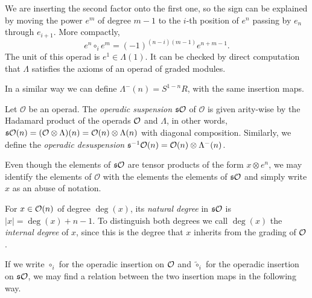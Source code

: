 \documentclass[join.tex]{subfiles}
\begin{document}
We are inserting the second factor onto the first one, so the sign can be explained  by moving the power $e^m$ of degree $m-1$ to the $i$-th position of $e^n$ passing by $e_{n}$ through $e_{i+1}$. More compactly, \[e^n\circ_i e^m=(-1)^{(n-i)(m-1)}e^{n+m-1}.\] The unit of this operad is $e^1\in\Lambda(1)$. It can be checked by direct computation that $\Lambda$ satisfies the axioms of an operad of graded modules.

In a similar way we can define $\Lambda^-(n)=S^{1-n}R$, with the same insertion maps.
\begin{defin}
Let $\mathcal{O}$ be an operad. The \emph{operadic suspension} $\mathfrak{s}{\mathcal O}$ of $\mathcal{O}$ is given arity-wise by the Hadamard product of the operads ${\mathcal O}$ and $\Lambda$, in other words, $\mathfrak{s}{\mathcal O}(n)=(\mathcal{O}\otimes\Lambda)(n)=\mathcal{O}(n)\otimes\Lambda(n)$ with diagonal composition. Similarly, we define the \emph{operadic desuspension} $\mathfrak{s}^{-1}{\mathcal O}(n)=\mathcal{O}(n)\otimes\Lambda^-(n)$.
\end{defin}

Even though the elements of $\mathfrak{s}{\mathcal O}$ are tensor products of the form $x\otimes e^n$, we may identify the elements of $\mathcal{O}$ with the elements the elements of $\mathfrak{s}{\mathcal O}$ and simply write $x$ as an abuse of notation. 

\begin{defin}
For $x\in{\mathcal O}(n)$ of degree $\deg(x)$, its \emph{natural degree} in $\mathfrak{s}{\mathcal O}$ is $|x|=\deg(x)+n-1$. To distinguish both degrees we call $\deg(x)$ the \emph{internal degree} of $x$, since this is the degree that $x$ inherits from the grading of ${\mathcal O}$. 
\end{defin}

If we write $\circ_i$ for the operadic insertion on ${\mathcal O}$ and $\tilde{\circ}_i$ for the operadic insertion on $\mathfrak{s}{\mathcal O}$, we may find a relation between the two insertion maps in the following way. 
\end{document}
